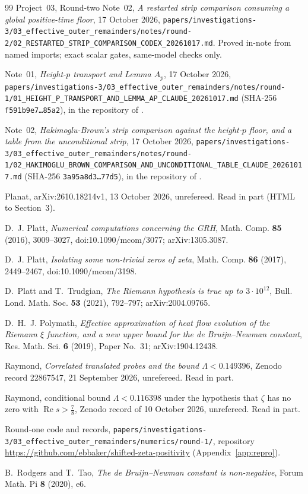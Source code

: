 \documentclass[11pt]{article}
\theoremstyle{definition}
\theoremstyle{remark}
\newcommand{\re}{\operatorname{Re}}
\numberwithin{equation}{section}
\begin{document}
\begin{thebibliography}{99}
Project~03, Round-two Note~02,
\emph{A restarted strip comparison consuming a global positive-time floor},
17 October 2026,
\nolinkurl{papers/investigations-3/03_effective_outer_remainders/notes/round-2/02_RESTARTED_STRIP_COMPARISON_CODEX_20261017.md}.
Proved in-note from named imports; exact scalar gates, same-model checks only.

Note~01, \emph{Height-$p$ transport and Lemma $A_p$}, 17 October 2026,
\nolinkurl{papers/investigations-3/03_effective_outer_remainders/notes/round-1/01_HEIGHT_P_TRANSPORT_AND_LEMMA_AP_CLAUDE_20261017.md}
(SHA-256 \texttt{f591b9e7\dots85a2}), in the repository of
\cite{records}.

Note~02, \emph{Hakimoglu-Brown's strip comparison against the height-$p$
floor, and a table from the unconditional strip}, 17 October 2026,
\nolinkurl{papers/investigations-3/03_effective_outer_remainders/notes/round-1/02_HAKIMOGLU_BROWN_COMPARISON_AND_UNCONDITIONAL_TABLE_CLAUDE_20261017.md}
(SHA-256 \texttt{3a95a8d3\dots77d5}), in the repository of
\cite{records}.

Planat, arXiv:2610.18214v1, 13 October 2026, unrefereed. Read in part
(HTML to Section~3).

D.~J. Platt,
\emph{Numerical computations concerning the GRH},
Math. Comp. \textbf{85} (2016), 3009--3027, doi:10.1090/mcom/3077;
arXiv:1305.3087.

D.~J. Platt,
\emph{Isolating some non-trivial zeros of zeta},
Math. Comp. \textbf{86} (2017), 2449--2467, doi:10.1090/mcom/3198.

D.~Platt and T.~Trudgian,
\emph{The Riemann hypothesis is true up to $3\cdot10^{12}$},
Bull. Lond. Math. Soc. \textbf{53} (2021), 792--797; arXiv:2004.09765.

D.~H.~J. Polymath,
\emph{Effective approximation of heat flow evolution of the Riemann $\xi$
function, and a new upper bound for the de Bruijn--Newman constant},
Res. Math. Sci. \textbf{6} (2019), Paper No.~31; arXiv:1904.12438.

Raymond,
\emph{Correlated translated probes and the bound $\Lambda<0.149396$},
Zenodo record 22867547, 21 September 2026, unrefereed. Read in part.

Raymond, conditional bound $\Lambda<0.116398$ under the hypothesis that
$\zeta$ has no zero with $\re s>\frac78$, Zenodo record of 10 October 2026,
unrefereed. Read in part.

Round-one code and records,
\nolinkurl{papers/investigations-3/03_effective_outer_remainders/numerics/round-1/},
repository \url{https://github.com/ebbaker/shifted-zeta-positivity}
(Appendix~\ref{app:repro}).

B.~Rodgers and T.~Tao,
\emph{The de Bruijn--Newman constant is non-negative},
Forum Math. Pi \textbf{8} (2020), e6.

\end{thebibliography}
\end{document}
